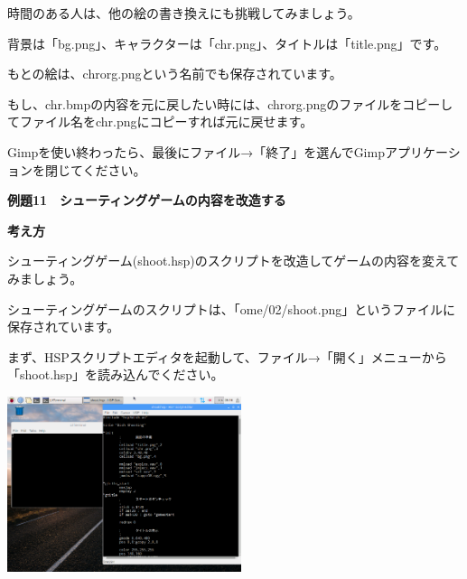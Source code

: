 \documentclass[a4paper,dvipdfmx]{jarticle}
\newcommand\textstyleqwerty[1]{#1}
\begin{document}
時間のある人は、他の絵の書き換えにも挑戦してみましょう。

背景は「bg.png」、キャラクターは「chr.png」、タイトルは「title.png」です。

もとの絵は、chrorg.pngという名前でも保存されています。

もし、chr.bmpの内容を元に戻したい時には、chrorg.pngのファイルをコピーしてファイル名をchr.pngにコピーすれば元に戻せます。


\bigskip

Gimpを使い終わったら、最後にファイル→「終了」を選んでGimpアプリケーションを閉じてください。


\bigskip

\clearpage
\textstyleqwerty{\textbf{例題11　シューティングゲームの内容を改造する}}


\bigskip

{\bfseries
考え方}


\bigskip

シューティングゲーム(shoot.hsp)のスクリプトを改造してゲームの内容を変えてみましょう。

シューティングゲームのスクリプトは、「ome/02/shoot.png」というファイルに保存されています。


\bigskip

まず、HSPスクリプトエディタを起動して、ファイル→「開く」メニューから「shoot.hsp」を読み込んでください。



\begin{center}
\includegraphics[width=6.853cm,height=5.135cm]{text02-img/text02-img043.png}

\end{center}

\bigskip


\bigskip


\bigskip


\bigskip


\bigskip


\bigskip
\end{document}
